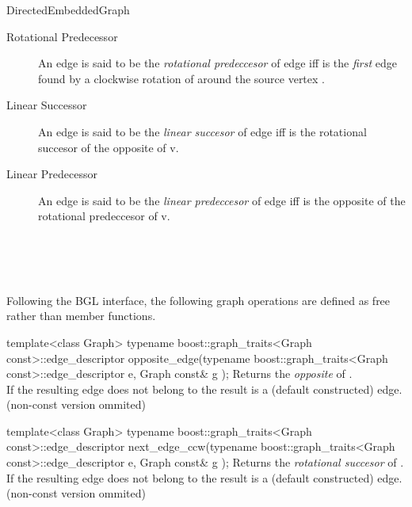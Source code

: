 \begin{ccRefConcept}{DirectedEmbeddedGraph}
\begin{description}
\item[Rotational Predecessor] 
An edge  is said to be the {\em rotational predeccesor}
of edge  iff  is the {\em first} edge found by 
a clockwise rotation of  around the source vertex .

\item[Linear Successor] 
An edge  is said to be the {\em linear succesor} of edge 
 iff  is the rotational succesor of the opposite
of v.
 
\item[Linear Predecessor] 
An edge  is said to be the {\em linear predeccesor} of edge 
 iff  is the opposite of the rotational predeccesor
of v.

\end{description}

\ccRefines
{}\\
\\
\\

\ccTypes

\ccOperations

Following the BGL interface, the following graph operations are defined as free rather than member functions.

  \ccFunction
  {template<class Graph>
  typename boost::graph_traits<Graph const>::edge_descriptor 
  opposite_edge(typename boost::graph_traits<Graph const>::edge_descriptor e, Graph const& g );
  }
  {Returns the {\em opposite} of .\\
  If the resulting edge does not belong to  the result is a  (default constructed) edge.\\
  (non-const version ommited)
  }
  
  \ccFunction
  {template<class Graph>
  typename boost::graph_traits<Graph const>::edge_descriptor 
  next_edge_ccw(typename boost::graph_traits<Graph const>::edge_descriptor e, Graph const& g );
  }
  {Returns the {\em rotational succesor} of .\\
  If the resulting edge does not belong to  the result is a  (default constructed) edge.\\
  (non-const version ommited)
  }
  

\end{ccRefConcept}
